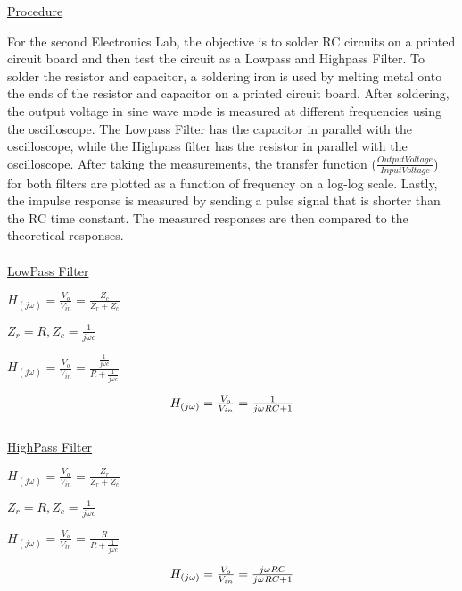 \documentclass[a4paper,10pt]{article}
\begin{document}
\underline{Procedure}

For the second Electronics Lab, the objective is to solder RC circuits on a printed circuit board and then test the circuit as a Lowpass and Highpass Filter. To solder the resistor and capacitor, a soldering iron is used by melting metal onto the ends of the resistor and capacitor on a printed circuit board. After soldering, the output voltage in sine wave mode is measured at different frequencies using the oscilloscope. The Lowpass Filter has the capacitor in parallel with the oscilloscope, while the Highpass filter has the resistor in parallel with the oscilloscope. After taking the measurements, the transfer function ($\frac{Output Voltage}{Input Voltage}$) for both filters are plotted as a function of frequency on a log-log scale. Lastly, the impulse response is measured by sending a pulse signal that is shorter than the RC time constant. The measured responses are then compared to the theoretical responses. \\
\\
\underline{LowPass Filter}
\\
\centerline{ $ H_{(j\omega)} = \frac{V_o}{V_{in}} = \frac{Z_c}{Z_r + Z_c} $ }
\centerline{ $ Z_r = R, Z_c = \frac{1}{j\omega c} $}
\centerline{ $ H_{(j\omega)} = \frac{V_o}{V_{in}} = \frac{\frac{1}{j\omega c}}{R + \frac{1}{j\omega c}} $ }
\begin{equation}
\label{eq:LowPassFunction}
\centerline{ $ H_{(j\omega)} = \frac{V_o}{V_{in}} = \frac{1}{j\omega RC + 1} $ }
\end{equation}
\\
\underline{HighPass Filter}
\\
\centerline{ $ H_{(j\omega)} = \frac{V_o}{V_{in}} = \frac{Z_r}{Z_r + Z_c} $ }
\centerline{ $ Z_r = R, Z_c = \frac{1}{j\omega c} $}
\centerline{ $ H_{(j\omega)} = \frac{V_o}{V_{in}} = \frac{R}{R + \frac{1}{j\omega c}} $ }
\begin{equation}
\label{eq:HighPassFunction}
\centerline{ $ H_{(j\omega)} = \frac{V_o}{V_{in}} = \frac{j\omega RC}{j\omega RC + 1} $ }
\end{equation}
\end{document}
